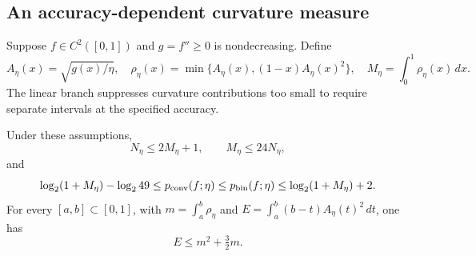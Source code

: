 \subsection{An accuracy-dependent curvature measure}

Suppose $f\in C^2([0,1])$ and $g=f''\ge0$ is nondecreasing. Define
\begin{equation}\label{eq:curvature-density}
 A_\eta(x)=\sqrt{g(x)/\eta},\quad
 \rho_\eta(x)=\min\{A_\eta(x),(1-x)A_\eta(x)^2\},\quad
 M_\eta=\int_0^1\rho_\eta(x)\,dx.
\end{equation}
The linear branch suppresses curvature contributions too small to
require separate intervals at the specified accuracy.

\begin{theorem}\label{thm:curvature-mass}
Under these assumptions,
\begin{equation}\label{eq:mass-chord-law}
 N_\eta\le2M_\eta+1,\qquad M_\eta\le24N_\eta,
\end{equation}
and
\begin{equation}\label{eq:mass-dimension-law}
 \log_2(1+M_\eta)-\log_2 49\le p_{\mathrm{conv}}(f;\eta)
 \le p_{\mathrm{bin}}(f;\eta)\le\log_2(1+M_\eta)+2.
\end{equation}
For every $[a,b]\subset[0,1]$, with
$m=\int_a^b\rho_\eta$ and
$E=\int_a^b(b-t)A_\eta(t)^2\,dt$, one has
\begin{equation}\label{eq:mass-local-remainder}
 E\le m^2+\tfrac32m.
\end{equation}
\end{theorem}
